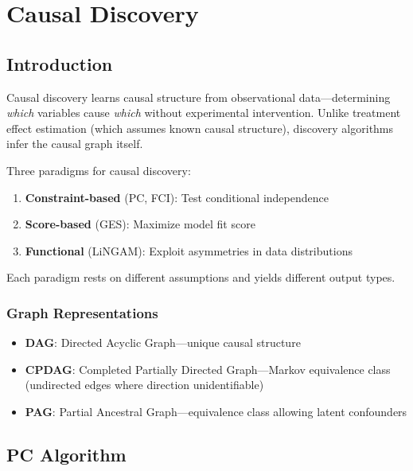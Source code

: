 \chapter{Causal Discovery}
\label{app:discovery}

\section{Introduction}

Causal discovery learns causal structure from observational data---determining \textit{which} variables cause \textit{which} without experimental intervention. Unlike treatment effect estimation (which assumes known causal structure), discovery algorithms infer the causal graph itself.

\begin{insight}
Three paradigms for causal discovery:
\begin{enumerate}
    \item \textbf{Constraint-based} (PC, FCI): Test conditional independence
    \item \textbf{Score-based} (GES): Maximize model fit score
    \item \textbf{Functional} (LiNGAM): Exploit asymmetries in data distributions
\end{enumerate}
Each paradigm rests on different assumptions and yields different output types.
\end{insight}

\subsection{Graph Representations}

\begin{definition}
\begin{itemize}
    \item \textbf{DAG}: Directed Acyclic Graph---unique causal structure
    \item \textbf{CPDAG}: Completed Partially Directed Graph---Markov equivalence class (undirected edges where direction unidentifiable)
    \item \textbf{PAG}: Partial Ancestral Graph---equivalence class allowing latent confounders
\end{itemize}
\end{definition}


\section{PC Algorithm}

